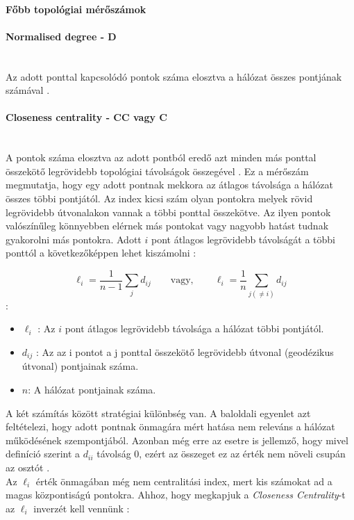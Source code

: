 \documentclass[a4paper,12pt]{article}
\begin{document}
	 \paragraph{Főbb topológiai mérőszámok}

	 \paragraph{Normalised degree - D} \mbox{}\\Az adott ponttal kapcsolódó pontok száma elosztva a hálózat összes pontjának számával \cite{top_indexes}.

	 \paragraph{Closeness centrality - CC vagy C } \mbox{}\\ A pontok száma elosztva az adott pontból eredő azt minden más ponttal összekötő legrövidebb topológiai távolságok összegével \cite{top_indexes}. Ez a mérőszám megmutatja, hogy egy adott pontnak mekkora az átlagos távolsága a hálózat összes többi pontjától. Az index kicsi szám olyan pontokra melyek rövid legrövidebb útvonalakon vannak a többi ponttal összekötve. Az ilyen pontok valószínűleg könnyebben elérnek más pontokat vagy nagyobb hatást tudnak gyakorolni más pontokra. Adott $i$ pont átlagos legrövidebb távolságát a többi ponttól a következőképpen lehet kiszámolni \cite{newman_networks}:

	 	\begin{equation}
			\ell_i= \frac{1}{n-1} \sum_{j} d_{ij} \qquad \mathrm{vagy,} \qquad \ell_i= \frac{1}{n} \sum_{j (\neq i)} d_{ij}
	 	\end{equation}
	 	 :
	 	 \begin{itemize}[label=]
	 	 	\item $\ell_i$ : Az $i$ pont átlagos legrövidebb távolsága a hálózat többi pontjától.
			\item $d_{ij}$ : Az az i pontot a j ponttal összekötő legrövidebb útvonal (geodézikus útvonal) pontjainak száma.
			\item $n$: A hálózat pontjainak száma.
	 	 \end{itemize}

	 A két számítás között stratégiai különbség van. A baloldali egyenlet azt feltételezi, hogy adott pontnak önmagára mért hatása nem releváns a hálózat működésének szempontjából. Azonban még erre az esetre is jellemző, hogy mivel definíció szerint a $d_{ii}$ távolság 0, ezért az összeget ez az érték nem növeli csupán az osztót \cite{newman_networks}.  \\
	 Az $\ell_i$ érték önmagában még nem centralitási index, mert kis számokat ad a magas központiságú pontokra. Ahhoz, hogy megkapjuk a \textit{Closeness Centrality}-t az $\ell_i$ inverzét kell vennünk \cite{newman_networks}:
\end{document}
